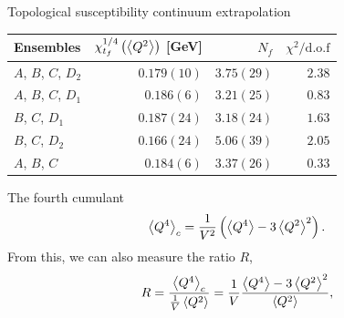 \documentclass[10pt,show notes on second screen]{beamer}
\begin{document}
\begin{frame}{Topological susceptibility continuum extrapolation}
\begin{table}
    \centering
    \begin{tabular}{l r r r}
        \toprule
        Ensembles               & $\chi_{t_f}^{1/4}\left( \left\langle{Q^2}\right\rangle \right)$ [GeV]   & $N_f$         & $\chi^2/\mathrm{d.o.f}$ \\ \midrule
        $A$, $B$, $C$, $D_2$    & $0.179(10)$                                           & $3.75(29)$    & $2.38$ \\
        $A$, $B$, $C$, $D_1$    & $0.186(6)$                                            & $3.21(25)$    & $0.83$ \\
        $B$, $C$, $D_1$         & $0.187(24)$                                           & $3.18(24)$    & $1.63$ \\ 
        $B$, $C$, $D_2$         & $0.166(24)$                                           & $5.06(39)$    & $2.05$ \\ 
        $A$, $B$, $C$           & $0.184(6)$                                            & $3.37(26)$    & $0.33$ \\
        \bottomrule
    \end{tabular}
\end{table}
\end{frame}

\begin{frame}{The fourth cumulant}
\begin{align*}
    \left\langle{Q^4}\right\rangle_c = \frac{1}{V^2}\left(\left\langle{Q^4}\right\rangle - 3\left\langle{Q^2}\right\rangle^2\right).
\end{align*}%
From this, we can also measure the ratio $R$,
\begin{align*}
    R = \frac{\left\langle{Q^4}\right\rangle_c}{\frac{1}{V}\left\langle{Q^2}\right\rangle} = \frac{1}{V}\frac{\left\langle{Q^4}\right\rangle - 3\left\langle{Q^2}\right\rangle^2}{\left\langle{Q^2}\right\rangle},
\end{align*}
\end{frame}
\end{document}
